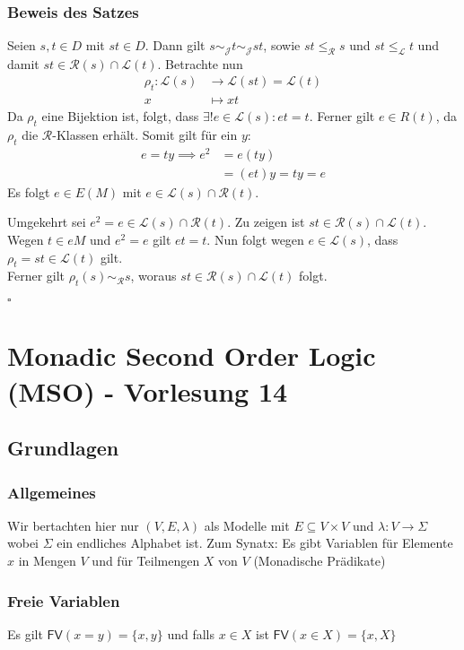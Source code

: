 \documentclass[12pt, german]{article}
\newcommand{\grer}{\sim_{\mathcal{R}}}
\newcommand{\grej}{\sim_{\mathcal{J}}}
\newcommand{\lgreleq}{\leqslant_{\mathcal{L}}}
\newcommand{\lgrereq}{\leqslant_{\mathcal{R}}}
\newcommand{\lcal}{\mathcal L}
\newcommand{\rcal}{\mathcal R}
\newcommand{\fv}{\mathsf{FV}}
\newcommand{\bewiesen}{
	
	\begin{flushright}
		$\square$  \\
\end{flushright}}
\begin{document}
	\subsubsection{Beweis des Satzes}
	Seien $s,t \in D$ mit $st \in D$. Dann gilt $s \grej t \grej st$, sowie $st \lgrereq s$ und $st \lgreleq t $ und damit $ st \in \rcal(s) \cap \lcal(t)$.
	Betrachte nun 
	\begin{align*}
		\rho_t : \lcal(s) &\to \lcal(st) = \lcal(t) \\
		x &\mapsto xt
	\end{align*}
	Da $\rho_t $ eine Bijektion ist, folgt, dass $\exists! e \in \lcal(s): et = t$. Ferner gilt $e \in R(t)$, da $\rho_t$ die $\rcal$-Klassen erhält. Somit gilt für ein $y$: 
	\begin{align*}
		e = ty \implies e^2 &= e(ty)  \\
		&= (et)y =ty = e
	\end{align*}
	Es folgt $ e \in E(M)$ mit $e \in \lcal(s) \cap \rcal(t)$. 
	\newline
	
	Umgekehrt sei $e^2 = e \in \lcal(s) \cap \rcal(t)$. Zu zeigen ist $st \in \rcal(s) \cap \lcal(t)$. \\
	Wegen $ t \in eM$ und $e^2 = e$ gilt $et =t$.
	Nun folgt wegen $e \in \lcal(s)$, dass $\rho_t = st \in \lcal(t)$ gilt. \\ 
	Ferner gilt $\rho_t(s) \grer s$, woraus $st \in \rcal(s) \cap \lcal(t)$ folgt.
	\bewiesen
	
\section{Monadic Second Order Logic (MSO) - Vorlesung 14}
\subsection{Grundlagen}
\subsubsection{Allgemeines}
Wir bertachten hier nur $(V, E ,\lambda)$ als Modelle mit $E \subseteq V \times V$ und $\lambda : V \to \Sigma$ wobei $\Sigma$ ein endliches Alphabet ist.
Zum Synatx: Es gibt Variablen für Elemente $x$ in Mengen $V$ und für Teilmengen $X$ von $V$ (Monadische Prädikate)

\subsubsection{Freie Variablen}
	Es gilt $\fv(x=y)=\{x,y\}$ und falls $x \in X$ ist $\fv(x \in X) = \{x, X\}$
\end{document}
